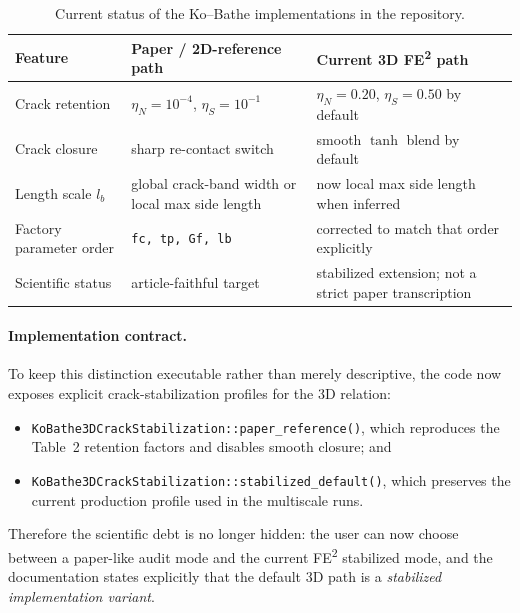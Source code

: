 \begin{table}[htbp]
\centering
\caption{Current status of the Ko--Bathe implementations in the repository.}
\label{tab:kb-implementation-audit}
\begin{tabular}{@{}p{}p{}p{}@{}}
\toprule
\textbf{Feature} & \textbf{Paper / 2D-reference path} & \textbf{Current 3D FE\textsuperscript{2} path} \\
\midrule
Crack retention & $\eta_N=10^{-4}$, $\eta_S=10^{-1}$ & $\eta_N=0.20$, $\eta_S=0.50$ by default \\
Crack closure   & sharp re-contact switch & smooth \(\tanh\) blend by default \\
Length scale \(l_b\) & global crack-band width or local max side length & now local max side length when inferred \\
Factory parameter order & \texttt{fc, tp, Gf, lb} & corrected to match that order explicitly \\
Scientific status & article-faithful target & stabilized extension; not a strict paper transcription \\
\bottomrule
\end{tabular}
\end{table}

\paragraph{Implementation contract.}
To keep this distinction executable rather than merely descriptive, the code
now exposes explicit crack-stabilization profiles for the 3D relation:
\begin{itemize}
  \item \texttt{KoBathe3DCrackStabilization::paper\_reference()}, which
    reproduces the Table~2 retention factors and disables smooth closure; and
  \item \texttt{KoBathe3DCrackStabilization::stabilized\_default()}, which
    preserves the current production profile used in the multiscale runs.
\end{itemize}
Therefore the scientific debt is no longer hidden: the user can now choose
between a paper-like audit mode and the current FE\textsuperscript{2}
stabilized mode, and the documentation states explicitly that the default 3D
path is a \emph{stabilized implementation variant}.

